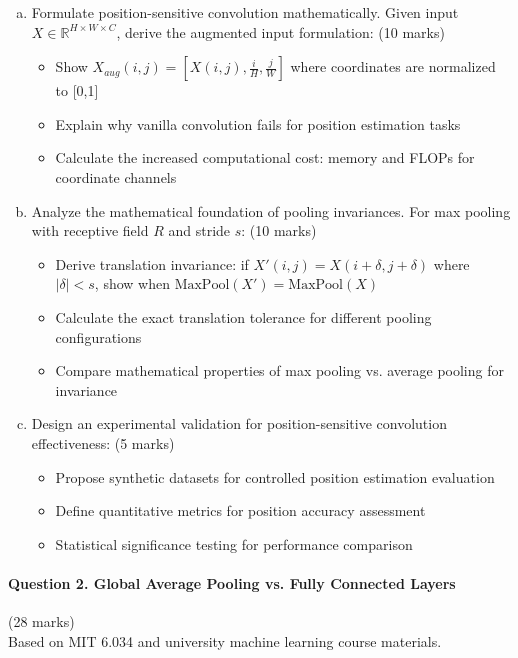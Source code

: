 \documentclass[12pt]{article}
\newcommand{\shortanswer}{\vspace{2cm}}
\newcommand{\mediumanswer}{\vspace{3cm}}
\newcommand{\journalspace}{\vspace{4.5cm}}
\begin{document}
\begin{enumerate}[(a)]
    \item Formulate position-sensitive convolution mathematically. Given input $X \in \mathbb{R}^{H \times W \times C}$, derive the augmented input formulation: \hfill (10 marks)
    \begin{itemize}
        \item Show $X_{aug}(i,j) = [X(i,j), \frac{i}{H}, \frac{j}{W}]$ where coordinates are normalized to [0,1]
        \item Explain why vanilla convolution fails for position estimation tasks
        \item Calculate the increased computational cost: memory and FLOPs for coordinate channels
    \end{itemize}
    
    \journalspace
    
    \item Analyze the mathematical foundation of pooling invariances. For max pooling with receptive field $R$ and stride $s$: \hfill (10 marks)
    \begin{itemize}
        \item Derive translation invariance: if $X'(i,j) = X(i+\delta, j+\delta)$ where $|\delta| < s$, show when $\text{MaxPool}(X') = \text{MaxPool}(X)$
        \item Calculate the exact translation tolerance for different pooling configurations
        \item Compare mathematical properties of max pooling vs. average pooling for invariance
    \end{itemize}
    
    \mediumanswer
    
    \item Design an experimental validation for position-sensitive convolution effectiveness: \hfill (5 marks)
    \begin{itemize}
        \item Propose synthetic datasets for controlled position estimation evaluation
        \item Define quantitative metrics for position accuracy assessment
        \item Statistical significance testing for performance comparison
    \end{itemize}
    
    \shortanswer
\end{enumerate}

\newpage
\paragraph{Question 2. Global Average Pooling vs. Fully Connected Layers}{{\hfill (28 marks)}}\\
Based on MIT 6.034 and university machine learning course materials.
\end{document}
